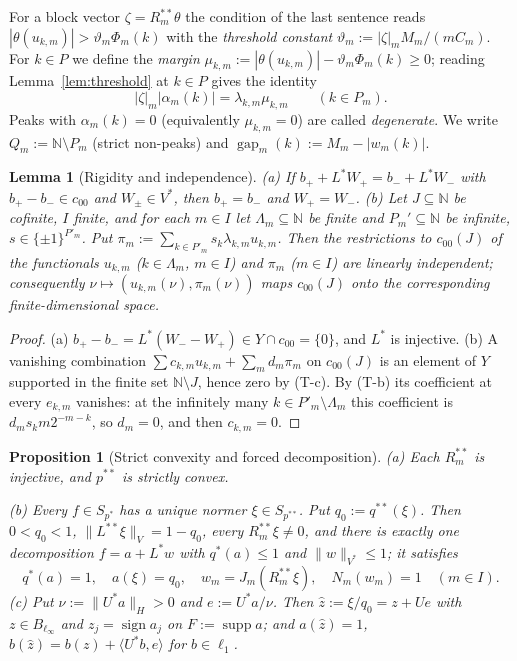 \documentclass[10pt]{amsart}
\newtheorem{lemma}[theorem]{Lemma}
\newtheorem{proposition}[theorem]{Proposition}
\theoremstyle{definition}
\theoremstyle{remark}
\newcommand{\supp}{\operatorname{supp}}
\newcommand{\sgn}{\operatorname{sign}}
\newcommand{\N}{\mathbb N}
\newcommand{\gap}{\operatorname{gap}}
\newcommand{\zh}{\hat z}
\newcommand{\ip}[2]{\langle #1,#2\rangle}
\begin{document}
For a block vector $\zeta=R_m^{**}\theta$ the condition of the last
sentence reads $|\theta(u_{k,m})|>\vartheta_m\Phi_m(k)$ with the
\emph{threshold constant} $\vartheta_m:=|\zeta|_mM_m/(mC_m)$.  For $k\in P$
we define the \emph{margin}
$\mu_{k,m}:=|\theta(u_{k,m})|-\vartheta_m\Phi_m(k)\ge0$; reading
Lemma~\ref{lem:threshold} at $k\in P$ gives the identity
\begin{equation}\label{eq:margin}
 |\zeta|_m|\alpha_m(k)|=\lambda_{k,m}\mu_{k,m}\qquad(k\in P_m).
\end{equation}
Peaks with $\alpha_m(k)=0$ (equivalently $\mu_{k,m}=0$) are called
\emph{degenerate}.  We write $Q_m:=\N\setminus P_m$ (strict non-peaks) and
$\gap_m(k):=M_m-|w_m(k)|$.

\begin{lemma}[Rigidity and independence]\label{lem:rigidity}
\textup{(a)} If $b_++L^*W_+=b_-+L^*W_-$ with $b_+-b_-\in c_{00}$ and
$W_\pm\in V^*$, then $b_+=b_-$ and $W_+=W_-$.
\textup{(b)} Let $J\subseteq\N$ be cofinite, $I$ finite, and for each
$m\in I$ let $\Lambda_m\subseteq\N$ be finite and $P_m'\subseteq\N$ be
infinite, $s\in\{\pm1\}^{P'_m}$.  Put
$\pi_m:=\sum_{k\in P'_m}s_k\lambda_{k,m}u_{k,m}$.  Then the restrictions to
$c_{00}(J)$ of the functionals $u_{k,m}$ \textup{(}$k\in\Lambda_m$,
$m\in I$\textup{)} and $\pi_m$ \textup{(}$m\in I$\textup{)} are linearly
independent; consequently $\nu\mapsto(u_{k,m}(\nu),\pi_m(\nu))$ maps
$c_{00}(J)$ onto the corresponding finite-dimensional space.
\end{lemma}

\begin{proof}
(a) $b_+-b_-=L^*(W_--W_+)\in Y\cap c_{00}=\{0\}$, and $L^*$ is injective.
(b) A vanishing combination
$\sum c_{k,m}u_{k,m}+\sum_md_m\pi_m$ on $c_{00}(J)$ is an element of $Y$
supported in the finite set $\N\setminus J$, hence zero by (T-c).  By
(T-b) its coefficient at every $e_{k,m}$ vanishes: at the infinitely many
$k\in P'_m\setminus\Lambda_m$ this coefficient is $d_ms_km2^{-m-k}$, so
$d_m=0$, and then $c_{k,m}=0$.
\end{proof}

\begin{proposition}[Strict convexity and forced decomposition]\label{prop:forced}
\textup{(a)} Each $R_m^{**}$ is injective, and $p^{**}$ is strictly convex.

\textup{(b)} Every $f\in S_{p^*}$ has a unique normer $\xi\in S_{p^{**}}$.
Put $q_0:=q^{**}(\xi)$.  Then $0<q_0<1$, $\|L^{**}\xi\|_V=1-q_0$, every
$R_m^{**}\xi\ne0$, and there is exactly one decomposition $f=a+L^*w$ with
$q^*(a)\le1$ and $\|w\|_{V^*}\le1$; it satisfies
\[
 q^*(a)=1,\quad a(\xi)=q_0,\quad w_m=J_m(R_m^{**}\xi),\quad N_m(w_m)=1
 \quad(m\in I).
\]
\textup{(c)} Put $\nu:=\|U^*a\|_H>0$ and $e:=U^*a/\nu$.  Then
$\zh:=\xi/q_0=z+Ue$ with $z\in B_{\ell_\infty}$ and $z_j=\sgn a_j$ on
$F:=\supp a$; and $a(\zh)=1$, $b(\zh)=b(z)+\ip{U^*b}{e}$ for
$b\in\ell_1$.
\end{proposition}
\end{document}
